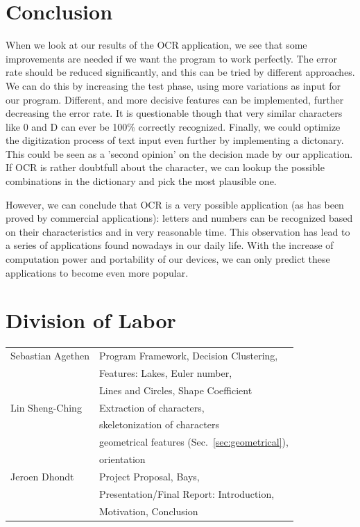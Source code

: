 \documentclass{article}
\begin{document}
\section{Conclusion}
When we look at our results of the OCR application, we see that some improvements are needed if we want the program to work perfectly. The error rate should be reduced significantly, and this can be tried by different approaches. We can do this by increasing the test phase, using more variations as input for our program. Different, and more decisive features can be implemented, further decreasing the error rate. It is questionable though that very similar characters like 0 and D can ever be 100\% correctly recognized. Finally, we could optimize the digitization process of text input even further by implementing a dictonary. This could be seen as a 'second opinion' on the decision made by our application. If OCR is rather doubtfull about the character, we can lookup the possible combinations in the dictionary and pick the most plausible one.

However, we can conclude that OCR is a very possible application (as has been proved by commercial applications): letters and numbers can be recognized based on their characteristics and in very reasonable time. This observation has lead to a series of applications found nowadays in our daily life. With the increase of computation power and portability of our devices, we can only predict these applications to become even more popular.

\section{Division of Labor}

\begin{tabular}{|l|l|}
 \hline
 Sebastian Agethen & Program Framework, Decision Clustering, \\
  & Features: Lakes, Euler number, \\
 & Lines and Circles, Shape Coefficient\\
\hline
 Lin Sheng-Ching & Extraction of characters, \\
 &  skeletonization of characters\\
  & geometrical features (Sec.~\ref{sec:geometrical}), \\ & orientation \\
\hline
 Jeroen Dhondt & Project Proposal, Bays, \\
 & Presentation/Final Report: Introduction, \\
 & Motivation, Conclusion\\
\hline
\end{tabular}
\end{document}
